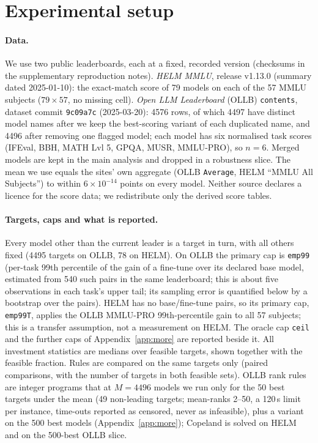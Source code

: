 \documentclass{article}
\begin{document}
\section{Experimental setup}
\label{sec:exp}
\paragraph{Data.}
We use two public leaderboards, each at a fixed, recorded version (checksums in the supplementary reproduction notes). \emph{HELM MMLU}, release v1.13.0 (summary dated 2025-01-10): the exact-match score of 79 models on each of the 57 MMLU subjects ($79\times57$, no missing cell). \emph{Open LLM Leaderboard} (OLLB) \texttt{contents}, dataset commit \texttt{9c09a7c} (2025-03-20): 4576 rows, of which 4497 have distinct model names after we keep the best-scoring variant of each duplicated name, and 4496 after removing one flagged model; each model has six normalised task scores (IFEval, BBH, MATH Lvl 5, GPQA, MUSR, MMLU-PRO), so $n=6$. Merged models are kept in the main analysis and dropped in a robustness slice. The mean we use equals the sites' own aggregate (OLLB \texttt{Average}, HELM ``MMLU All Subjects'') to within $6\times10^{-14}$ points on every model. Neither source declares a licence for the score data; we redistribute only the derived score tables.

\paragraph{Targets, caps and what is reported.}
Every model other than the current leader is a target in turn, with all others fixed (4495 targets on OLLB, 78 on HELM). On OLLB the primary cap is \texttt{emp99} (per-task 99th percentile of the gain of a fine-tune over its declared base model, estimated from 540 such pairs in the same leaderboard; this is about five observations in each task's upper tail; its sampling error is quantified below by a bootstrap over the pairs). HELM has no base/fine-tune pairs, so its primary cap, \texttt{emp99T}, applies the OLLB MMLU-PRO 99th-percentile gain to all 57 subjects; this is a transfer assumption, not a measurement on HELM. The oracle cap \texttt{ceil} and the further caps of Appendix~\ref{app:more} are reported beside it. All investment statistics are medians over feasible targets, shown together with the feasible fraction. Rules are compared on the same targets only (paired comparisons, with the number of targets in both feasible sets). OLLB rank rules are integer programs that at $M=4496$ models we run only for the 50 best targets under the mean (49 non-leading targets; mean-ranks 2--50, a 120\,s limit per instance, time-outs reported as censored, never as infeasible), plus a variant on the 500 best models (Appendix~\ref{app:more}); Copeland is solved on HELM and on the 500-best OLLB slice.
\end{document}
